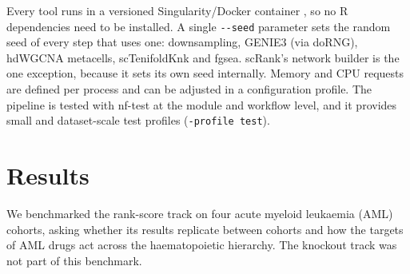 \documentclass[unnumsec,webpdf,contemporary,large]{oup-authoring-template}
\newcommand{\param}[1]{\texttt{-{}-#1}}
\begin{document}
Every tool runs in a versioned Singularity/Docker container \citep{Kurtzer2017singularity}, so no R dependencies need to be installed. A single \param{seed} parameter sets the random seed of every step that uses one: downsampling, GENIE3 (via doRNG), hdWGCNA metacells, scTenifoldKnk and fgsea. scRank's network builder is the one exception, because it sets its own seed internally. Memory and CPU requests are defined per process and can be adjusted in a configuration profile. The pipeline is tested with nf-test at the module and workflow level, and it provides small and dataset-scale test profiles (\texttt{-profile test}).

\section{Results}

We benchmarked the rank-score track on four acute myeloid leukaemia (AML) cohorts, asking whether its results replicate between cohorts and how the targets of AML drugs act across the haematopoietic hierarchy. The knockout track was not part of this benchmark.
\end{document}
